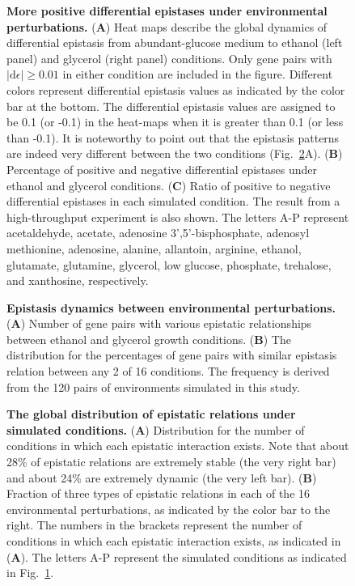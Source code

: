 \documentclass[10pt]{article}
\def\D{\mathrm{d}}
\newcommand{\Fig}{Fig.}
\begin{document}
\begin{figure}[!htb]
\caption{
{\bf More positive differential epistases under environmental
perturbations.} (\textbf{A}) Heat maps describe the global dynamics of
differential epistasis from abundant-glucose medium to ethanol (left
panel) and glycerol (right panel) conditions. Only gene pairs with
$\left|\D\epsilon\right| \geq 0.01$ in either condition are included
in the figure. Different colors represent differential epistasis
values as indicated by the color bar at the bottom. The differential
epistasis values are assigned to be 0.1 (or -0.1) in the heat-maps
when it is greater than 0.1 (or less than -0.1). It is noteworthy to
point out that the epistasis patterns are indeed very different
between the two conditions (\Fig~\ref{fig:eef2}A). (\textbf{B})
Percentage of positive and negative differential epistases under
ethanol and glycerol conditions. (\textbf{C}) Ratio of positive to
negative differential epistases
in each simulated condition. The result from a high-throughput
experiment is also shown. The letters A-P represent acetaldehyde,
acetate, adenosine 3',5'-bisphosphate, adenosyl methionine, adenosine,
alanine, allantoin, arginine, ethanol, glutamate, glutamine, glycerol,
low glucose, phosphate, trehalose, and xanthosine, respectively.
}
\label{fig:eef1}
\end{figure}

\begin{figure}[!htb]
\caption{
{\bf Epistasis dynamics between environmental perturbations.} (\textbf{A}) 
Number of gene pairs with various epistatic relationships between ethanol and
glycerol growth conditions. (\textbf{B}) The distribution for the percentages
of gene pairs with similar epistasis relation between any 2 of 16
conditions. The frequency is derived from the 120 pairs of
environments simulated in this study.
}
\label{fig:eef2}
\end{figure}


\begin{figure}[!htb]
\caption{
{\bf The global distribution of epistatic relations under simulated
conditions.} (\textbf{A}) Distribution for the number of conditions in which
each epistatic interaction exists. Note that about 28\% of
epistatic relations are extremely stable (the very right bar) and
about 24\% are extremely dynamic (the very left bar). (\textbf{B}) Fraction
of three types of epistatic relations in each of the 16 environmental
perturbations, as indicated by the color bar to the right. The numbers
in the brackets represent the number of conditions in which each
epistatic interaction exists, as indicated in (\textbf{A}). The letters A-P
represent the simulated conditions as indicated in \Fig~\ref{fig:eef1}.
}
\label{fig:eef3}
\end{figure}
\end{document}
